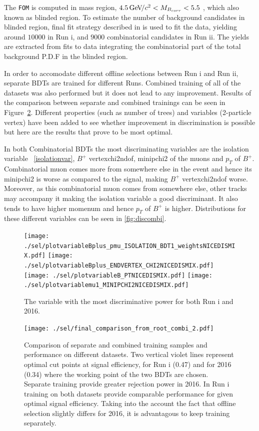 The \texttt{FOM} is computed in mass region, $4.5{\mathrm{\,Ge\kern -0.1em V\!/}c^2} <M_{B_{corr}} <5.5$ \gevcc, which also known as blinded region. To estimate the number of background candidates in blinded region, final fit strategy described in  is used to fit the data, yielding around $10000$ in Run \Rn{1}, and $9000$ combinatorial candidates in Run \Rn{2}. The yields are extracted from fits to data integrating the combinatorial part of the total background P.D.F in the blinded region.

In order to accomodate different offline selections between Run \Rn{1} and Run \Rn{2}, separate BDTs are trained for different Runs. Combined training of all of the datasets was also performed but it does not lead to any improvement. Results of the comparison between separate and combined trainings can be seen in Figure~\ref{fig:separatetraining}. Different properties (such as number of trees) and variables (2-particle vertex) have been added to see whether improvement in discrimination is possible but here are the results that prove to be most optimal.

In both Combinatorial BDTs the most discriminating variables are the isolation variable ~\autoref{isolationvar}, $B^{+}$ \gls{vertexchi2ndof}, \gls{minipchi2} of the muons and $p_{T}$ of $B^{+}$. Combinatorial muon comes more from somewhere else in the event and hence its \gls{minipchi2} is worse as compared to the signal, making $B^{+}$ \gls{vertexchi2ndof} worse. Moreover, as this combinatorial muon comes from somewhere else, other tracks may accompany it making the isolation variable a good discriminant. It also tends to have higher momenum and hence $p_{T}$ of $B^{+}$ is higher. Distributions for these different variables can be seen in \autoref{fig:discombi}. 


\begin{figure}[ht]
\centering
	\texttt{[image: ./sel/plotvariableBplus\_pmu\_ISOLATION\_BDT1\_weightsNICEDISMIX.pdf]}%
	\texttt{[image: ./sel/plotvariableBplus\_ENDVERTEX\_CHI2NICEDISMIX.pdf]}%
	\newline
	\texttt{[image: ./sel/plotvariableB\_PTNICEDISMIX.pdf]}%
	\texttt{[image: ./sel/plotvariablemu1\_MINIPCHI2NICEDISMIX.pdf]}%
	\caption{The variable with the most discriminative power for both Run \Rn{1} and 2016.}
\label{fig:discombi}
\end{figure}


\begin{figure}[H]
\centering
\texttt{[image: ./sel/final\_comparison\_from\_root\_combi\_2.pdf]}
	\caption{Comparison of separate and combined training samples and performance on different datasets. Two vertical violet lines represent optimal cut points at signal efficiency, for Run \Rn{1} (0.47) and for 2016 (0.34) where the working point of the two BDTs are chosen. Separate training provide greater rejection power in 2016. In Run \Rn{1} training on both datasets provide comparable performance for given optimal signal efficiency. Taking into the account the fact that offline selection slightly differs for 2016, it is advantagous to keep training separately.}
\label{fig:separatetraining}
\end{figure}

